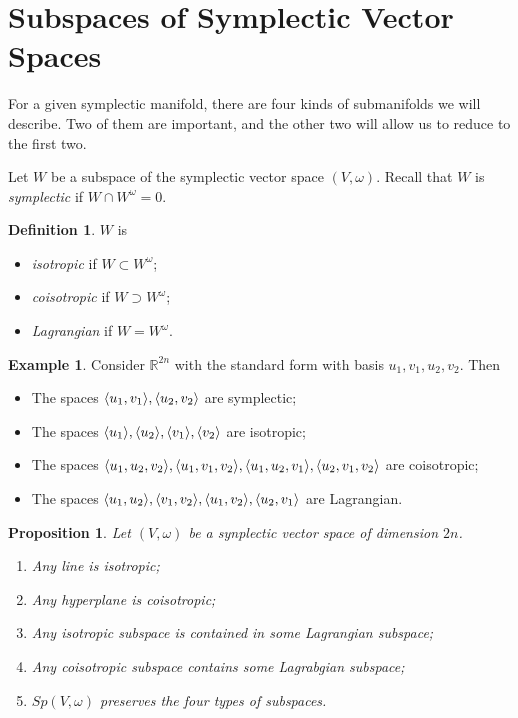 \documentclass[leqno, openany]{memoir}
\DeclarePairedDelimiter{\gen}{\langle}{\rangle}
\newtheorem{prop}[thm]{Proposition}
\theoremstyle{definition}
\newtheorem{defn}[thm]{Definition}
\newtheorem{exm}[thm]{Example}
\theoremstyle{remark}
\theoremstyle{plain}
\theoremstyle{definition}
\theoremstyle{remark}
\newcommand{\R}{\mathbb{R}}
\begin{document}
\section{Subspaces of Symplectic Vector Spaces}%
\label{sec:subspaces_of_symplectic_vector_spaces}

For a given symplectic manifold, there are four kinds of submanifolds we will
describe. Two of them are important, and the other two will allow us to reduce
to the first two.

Let $W$ be a subspace of the symplectic vector space $(V, \omega)$. Recall that
$W$ is \textit{symplectic} if $W \cap W^{\omega} = 0$.

\begin{defn} $W$ is \begin{itemize} \item \textit{isotropic} if $W \subset
W^{\omega}$; \item \textit{coisotropic} if $W \supset W^{\omega}$; \item
\textit{Lagrangian} if $W = W^{\omega}$.  \end{itemize} \end{defn}

\begin{exm} Consider $\R^{2n}$ with the standard form with basis $u_1, v_1,
    u_2, v_2$. Then \begin{itemize} \item The spaces $\gen{u_1, v_1}, \gen{u_2,
        v_2}$ are symplectic; \item The spaces $\gen{u_1}, \gen{u_2},
        \gen{v_1}, \gen{v_2}$ are isotropic; \item The spaces $\gen{u_1, u_2,
        v_2}, \gen{u_1, v_1, v_2}, \gen{u_1, u_2, v_1}, \gen{u_2, v_1, v_2}$
        are coisotropic; \item The spaces $\gen{u_1, u_2}, \gen{v_1, v_2},
        \gen{u_1, v_2}, \gen{u_2, v_1}$ are Lagrangian.  \end{itemize}
    \end{exm}

\begin{prop} Let $(V, \omega)$ be a synplectic vector space of dimension $2n$.
    \begin{enumerate} \item Any line is isotropic; \item Any hyperplane is
        coisotropic; \item Any isotropic subspace is contained in some
        Lagrangian subspace; \item Any coisotropic subspace contains some
        Lagrabgian subspace; \item $Sp(V, \omega)$ preserves the four types of
subspaces.  \end{enumerate} \end{prop}
\end{document}
